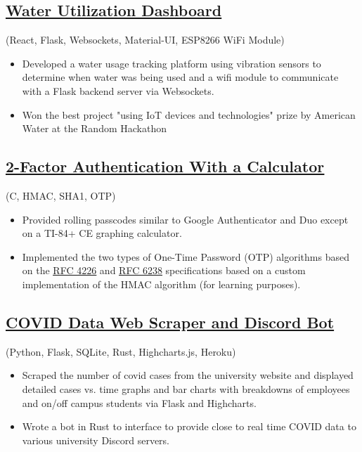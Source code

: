 \documentclass{article}
\begin{document}
\subsection{\href{https://youtu.be/DLzxrzFCyOs}{\underline{Water Utilization Dashboard}}} \hfill (React, Flask, Websockets, Material-UI, ESP8266 WiFi Module)
\begin{itemize}
    \item Developed a water usage tracking platform using vibration sensors to determine when water was being used and a wifi module to communicate with a Flask backend server via Websockets. 
    \item Won the best project "using IoT devices and technologies" prize by American Water at the Random Hackathon
\end{itemize}

\subsection{\href{https://youtu.be/DLzxrzFCyOs}{\underline{2-Factor Authentication With a Calculator}}} \hfill (C, HMAC, SHA1, OTP)
\begin{itemize}
    \item Provided rolling passcodes similar to Google Authenticator and Duo except on a TI-84+ CE graphing calculator.
    \item Implemented the two types of One-Time Password (OTP) algorithms based on the \href{https://tools.ietf.org/html/rfc4226}{\underline{RFC 4226}} and \href{https://tools.ietf.org/html/rfc6238}{\underline{RFC 6238}} specifications based on a custom implementation of the HMAC algorithm (for learning purposes).
\end{itemize}

\subsection{\href{https://youtu.be/DLzxrzFCyOs}{\underline{COVID Data Web Scraper and Discord Bot}}} \hfill (Python, Flask, SQLite, Rust, Highcharts.js, Heroku)
\begin{itemize}
    \item Scraped the number of covid cases from the university website and displayed detailed cases vs. time graphs and bar charts with breakdowns of employees and on/off campus students via Flask and Highcharts.
    \item Wrote a bot in Rust to interface to provide close to real time COVID data to various university Discord servers.
\end{itemize}
\end{document}
